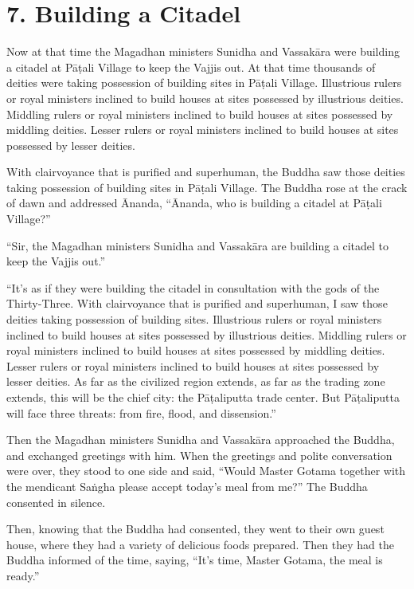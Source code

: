 \documentclass[12pt,openany]{book}%
\begin{document}
\section*{7. Building a Citadel }

Now at that time the Magadhan ministers Sunidha and \textsanskrit{Vassakāra} were building a citadel at \textsanskrit{Pāṭali} Village to keep the Vajjis out. At that time thousands of deities were taking possession of building sites in \textsanskrit{Pāṭali} Village. Illustrious rulers or royal ministers inclined to build houses at sites possessed by illustrious deities. Middling rulers or royal ministers inclined to build houses at sites possessed by middling deities. Lesser rulers or royal ministers inclined to build houses at sites possessed by lesser deities. 

With clairvoyance that is purified and superhuman, the Buddha saw those deities taking possession of building sites in \textsanskrit{Pāṭali} Village. The Buddha rose at the crack of dawn and addressed Ānanda, “Ānanda, who is building a citadel at \textsanskrit{Pāṭali} Village?” 

“Sir, the Magadhan ministers Sunidha and \textsanskrit{Vassakāra} are building a citadel to keep the Vajjis out.” 

“It’s as if they were building the citadel in consultation with the gods of the Thirty-Three. With clairvoyance that is purified and superhuman, I saw those deities taking possession of building sites. Illustrious rulers or royal ministers inclined to build houses at sites possessed by illustrious deities. Middling rulers or royal ministers inclined to build houses at sites possessed by middling deities. Lesser rulers or royal ministers inclined to build houses at sites possessed by lesser deities. As far as the civilized region extends, as far as the trading zone extends, this will be the chief city: the \textsanskrit{Pāṭaliputta} trade center. But \textsanskrit{Pāṭaliputta} will face three threats: from fire, flood, and dissension.” 

Then the Magadhan ministers Sunidha and \textsanskrit{Vassakāra} approached the Buddha, and exchanged greetings with him. When the greetings and polite conversation were over, they stood to one side and said, “Would Master Gotama together with the mendicant \textsanskrit{Saṅgha} please accept today’s meal from me?” The Buddha consented in silence. 

Then, knowing that the Buddha had consented, they went to their own guest house, where they had a variety of delicious foods prepared. Then they had the Buddha informed of the time, saying, “It’s time, Master Gotama, the meal is ready.” 
\end{document}
